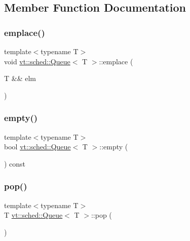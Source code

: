 \subsection{Member Function Documentation}
\mbox{\label{structvt_1_1sched_1_1_queue_a5b99b53786540fdff718540010fecb1b}} 
\subsubsection{\texorpdfstring{emplace()}{emplace()}}
{\footnotesize\ttfamily template$<$typename T$>$ \\
void \hyperlink{structvt_1_1sched_1_1_queue}{vt\+::sched\+::\+Queue}$<$ T $>$\+::emplace (\begin{DoxyParamCaption}\item[{T \&\&}]{elm }\end{DoxyParamCaption})\hspace{0.3cm}{\ttfamily [inline]}}

\mbox{\label{structvt_1_1sched_1_1_queue_a499b45b0a8c55731b09885dbd28882a8}} 
\subsubsection{\texorpdfstring{empty()}{empty()}}
{\footnotesize\ttfamily template$<$typename T$>$ \\
bool \hyperlink{structvt_1_1sched_1_1_queue}{vt\+::sched\+::\+Queue}$<$ T $>$\+::empty (\begin{DoxyParamCaption}{ }\end{DoxyParamCaption}) const\hspace{0.3cm}{\ttfamily [inline]}}

\mbox{\label{structvt_1_1sched_1_1_queue_ad5e435489eb04cd78a2da6acfa855331}} 
\subsubsection{\texorpdfstring{pop()}{pop()}}
{\footnotesize\ttfamily template$<$typename T$>$ \\
T \hyperlink{structvt_1_1sched_1_1_queue}{vt\+::sched\+::\+Queue}$<$ T $>$\+::pop (\begin{DoxyParamCaption}{ }\end{DoxyParamCaption})\hspace{0.3cm}{\ttfamily [inline]}}

